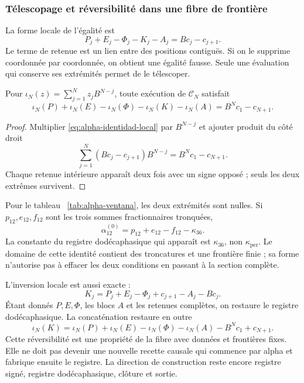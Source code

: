 \subsubsection{Télescopage et réversibilité dans une fibre de frontière}
\label{subsec:alpha-telescopia}

La forme locale de l'égalité est
\begin{equation}
 P_j+E_j-\Phi_j-K_j-A_j=Bc_j-c_{j+1}.
 \label{eq:alpha-identidad-local}
\end{equation}
Le terme de retenue est un lien entre des positions contiguës. Si on le supprime coordonnée par coordonnée, on obtient une égalité fausse. Seule une évaluation qui conserve ses extrémités permet de le télescoper.

\begin{proposition}
\label{prop:alpha-telescopia}
Pour \(\iota_N(z)=\sum_{j=1}^{N}z_jB^{N-j}\), toute exécution de
\(\mathcal C_N\) satisfait
\begin{equation}
 \iota_N(P)+\iota_N(E)-\iota_N(\Phi)-\iota_N(K)-\iota_N(A)
 =B^Nc_1-c_{N+1}.
 \label{eq:alpha-telescopia}
\end{equation}
\end{proposition}

\begin{proof}
Multiplier \eqref{eq:alpha-identidad-local} par \(B^{N-j}\) et ajouter  
produit du côté droit
\[
 \sum_{j=1}^{N}(Bc_j-c_{j+1})B^{N-j}=B^Nc_1-c_{N+1}.
\]
Chaque retenue intérieure apparaît deux fois avec un signe opposé ; seuls les deux extrêmes survivent.
\end{proof}

Pour le tableau ~\ref{tab:alpha-ventana}, les deux extrémités sont nulles. Si
\(p_{12},e_{12},f_{12}\) sont les trois sommes fractionnaires tronquées,
\[
 \alpha_{12}^{(0)}=p_{12}+e_{12}-f_{12}-\kappa_{36}.
\]
La constante du registre dodécaphasique qui apparaît est \(\kappa_{36}\), non
\(\kappa_{\mathrm{per}}\). Le domaine de cette identité contient
des troncatures et une frontière finie ; sa forme n'autorise pas à effacer les deux
conditions en passant à la section complète.

L'inversion locale est aussi exacte :
\[
 K_j=P_j+E_j-\Phi_j+c_{j+1}-A_j-Bc_j.
\]
Étant donnés \(P,E,\Phi\), les blocs \(A\) et les retenues complètes,  
on restaure le registre dodécaphasique. La concaténation restaure en outre
\[
 \iota_N(K)=\iota_N(P)+\iota_N(E)-\iota_N(\Phi)-\iota_N(A)
             -B^Nc_1+c_{N+1}.
\]
Cette réversibilité est une propriété de la fibre avec données et frontières fixes. Elle ne doit pas devenir une nouvelle recette causale qui commence par alpha et fabrique ensuite le registre. La direction de construction reste encore registre signé, registre dodécaphasique, clôture et sortie.

